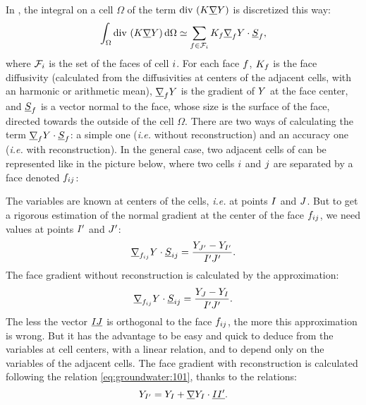 In \CS, the integral on a cell $\Omega$ of the term $\dive \left( K \grad \varia \right)$ is discretized this way:
\begin{equation}
 \label{discrete_diffusive}
\int_{\Omega} \dive \left( K \grad \varia \right) \dd \Omega \simeq \sum_{\face \in \Face{\celli}} K_\face \grad_\face \varia \cdot \vect{S}_\face,
\end{equation}
where $\Face{\celli}$ is the set of the faces of cell $\celli$. For each face $\face$,
$K_\face$ is the face diffusivity (calculated from the diffusivities at centers of
the adjacent cells, with an harmonic or arithmetic mean),
$\grad_\face \varia$ is the gradient of $\varia$ at the face center,
and $\vect{S}_\face$ is a vector normal to the face, whose size is the surface of the face, directed towards the outside of the cell $\Omega$.
There are two ways of calculating the term $\grad_\face Y \cdot \vect{S}_\face$: a simple one (\emph{i.e.} without reconstruction)
and an accuracy one (\emph{i.e.} with reconstruction). In the general case, two adjacent cells of \CS can be represented like in the picture below,
where two cells $\celli$ and $\cellj$ are separated by a face denoted $\fij$:
\begin{figure}[H]
\end{figure}
The variables are known at centers of the cells, \emph{i.e.} at points $\centi$ and $\centj$. But to get a rigorous estimation of the normal gradient at
the center of the face $\fij$, we need values at points $\centip$ and $\centjp$:
\begin{equation}
 \label{eq:groundwater:101}
\grad_{\fij}\varia \cdot \vect{S}_{\ij} = \frac{\varia_{\centjp}-\varia_{\centip}}{\centip\centjp}.
\end{equation}
The face gradient without reconstruction is calculated by the approximation:
\begin{equation}
 \label{eq:groundwater:102}
\grad_{\fij}\varia \cdot \vect{S}_{\ij} = \frac{\varia_{\centj}-\varia_{\centi}}{\centip\centjp}.
\end{equation}
The less the vector $\vect{\centi\centj}$ is orthogonal to the face $\fij$, the more this approximation is wrong. But it has the advantage to be easy and quick
to deduce from the variables at cell centers, with a linear relation, and to depend only on the variables of the adjacent cells.
The face gradient with reconstruction is calculated following the relation \eqref{eq:groundwater:101}, thanks to the relations:
\begin{equation}
 \label{103}
\varia_{\centip} = \varia_{\centi} + \grad \varia_\centi  \cdot \vect{\centi\centip}.
\end{equation}
